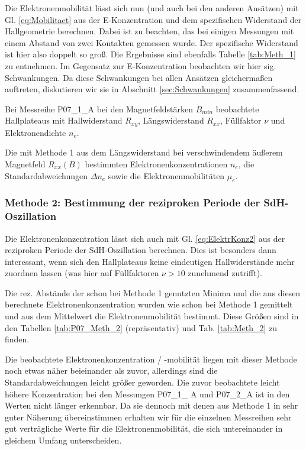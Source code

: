 Die Elektronenmobilität lässt sich nun (und auch bei den anderen Ansätzen) mit Gl. \ref{eq:Mobilitaet} aus der E-Konzentration und dem spezifischen Widerstand der Hallgeometrie berechnen. Dabei ist zu beachten, das bei einigen Messungen mit einem Abstand von zwei Kontakten gemessen wurde. Der spezifische Widerstand ist hier also doppelt so groß. Die Ergebnisse sind ebenfalls Tabelle \ref{tab:Meth_1} zu entnehmen. Im Gegensatz zur E-Konzentration beobachten wir hier sig. Schwankungen. Da diese Schwankungen bei allen Ansätzen gleichermaßen auftreten, diskutieren wir sie in Abschnitt \ref{sec:Schwankungen} zusammenfassend.

\begin{table}
	\centering
	\caption{Bei Messreihe P07\_1\_A bei den Magnetfeldstärken $B_{min}$ beobachtete Hallplateaus mit Hallwiderstand $R_{xy}$, Längswiderstand $R_{xx}$, Füllfaktor $\nu$ und Elektronendichte $n_e$.} 
	
	\label{tab:P07_Meth_1}
\end{table}
\begin{table}
	\centering
	\caption{Die mit Methode 1 aus dem Längswiderstand bei verschwindendem äußerem Magnetfeld $R_{xx}(B)$ bestimmten Elektronenkonzentrationen $n_e$, die Standardabweichungen $\Delta n_e$ sowie die Elektronenmobilitäten $\mu_e$.}
	
	\label{tab:Meth_1}
\end{table}

\newpage
\subsubsection{Methode 2: Bestimmung der reziproken Periode der SdH-Oszillation} \label{subsubsec:Meth_2}
Die Elektronenkonzentration lässt sich auch mit Gl. \ref{eq:ElektrKonz2} aus der reziproken Periode der SdH-Oszillation berechnen. Dies ist besonders dann interessant, wenn sich den Hallplateaus keine eindeutigen Hallwiderstände mehr zuordnen lassen (was hier auf Füllfaktoren $\nu > 10$ zunehmend zutrifft).

Die rez. Abstände der schon bei Methode 1 genutzten Minima und die aus diesen berechnete Elektronenkonzentration wurden wie schon bei Methode 1 gemittelt und aus dem Mittelwert die Elektronenmobilität bestimmt. Diese Größen sind in den Tabellen \ref{tab:P07_Meth_2} (repräsentativ) und Tab. \ref{tab:Meth_2} zu finden. 

Die beobachtete Elektronenkonzentration / -mobilität liegen mit dieser Methode noch etwas näher beieinander als zuvor, allerdings sind die Standardabweichungen leicht größer geworden. Die zuvor beobachtete leicht höhere Konzentration bei den Messungen P07\_1\_ A und P07\_2\_A ist in den Werten nicht länger erkennbar. Da sie dennoch mit denen aus Methode 1 in sehr guter Näherung übereinstimmen erhalten wir für die einzelnen Messreihen sehr gut verträgliche Werte für die Elektronenmobilität, die sich untereinander in gleichem Umfang unterscheiden.
 
